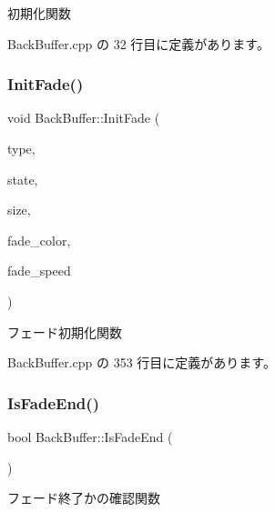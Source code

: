 初期化関数 



 Back\+Buffer.\+cpp の 32 行目に定義があります。

\mbox{\label{class_back_buffer_add3a034c7758dc6a72bb4582bf6ce78e}} 
\subsubsection{\texorpdfstring{Init\+Fade()}{InitFade()}}
{\footnotesize\ttfamily void Back\+Buffer\+::\+Init\+Fade (\begin{DoxyParamCaption}\item[{\mbox{\hyperlink{class_fade_ac06f27215b454aa05b93c236476d6e80}{Fade\+::\+Type}}}]{type,  }\item[{\mbox{\hyperlink{class_fade_ae77826bf3ff2ab95fb7b3b6f95cba80a}{Fade\+::\+State}}}]{state,  }\item[{\mbox{\hyperlink{_vector3_d_8h_a5ef6e95dfc5f9d3820b71772d99bbc25}{Vec2}}}]{size,  }\item[{\mbox{\hyperlink{_vector3_d_8h_a680c30c4a07d86fe763c7e01169cd6cc}{X\+Color4}}}]{fade\+\_\+color,  }\item[{float}]{fade\+\_\+speed }\end{DoxyParamCaption})}



フェード初期化関数 



 Back\+Buffer.\+cpp の 353 行目に定義があります。

\mbox{\label{class_back_buffer_aab8b2f4a0fdbadccdd9413c12830a377}} 
\subsubsection{\texorpdfstring{Is\+Fade\+End()}{IsFadeEnd()}}
{\footnotesize\ttfamily bool Back\+Buffer\+::\+Is\+Fade\+End (\begin{DoxyParamCaption}{ }\end{DoxyParamCaption})\hspace{0.3cm}{\ttfamily [inline]}}



フェード終了かの確認関数 



